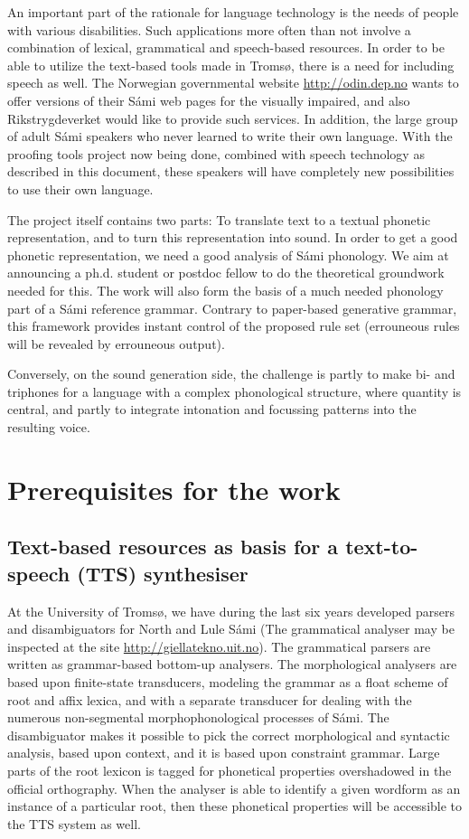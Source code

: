 \documentclass[a4paper,english]{article}
\begin{document}
An important part of the rationale for language technology is the needs of people with various disabilities. Such applications more often than not involve a combination of lexical, grammatical and speech-based resources. In order to be able to utilize the text-based tools made in Tromsø, there is a need for including speech as well. The Norwegian governmental website \url{http://odin.dep.no} wants to offer versions of their Sámi web pages for the visually impaired, and also Rikstrygdeverket would like to provide such services. In addition, the large group of adult Sámi speakers who never learned to write their own language. With the proofing tools project now being done, combined with speech technology as described in this document, these speakers will have completely new possibilities to use their own language.

The project itself contains two parts: To translate text to a textual phonetic representation, and to turn this representation into sound. In order to get a good phonetic representation, we need a good analysis of Sámi phonology. We aim at announcing a ph.d. student or postdoc fellow to do the theoretical groundwork needed for this. The work will also form the basis of a much needed phonology part of a Sámi reference grammar. Contrary to paper-based generative grammar, this framework provides instant control of the proposed rule set (errouneous rules will be revealed by errouneous output). 

Conversely, on the sound generation side, the challenge is partly to make bi- and triphones for a language with a complex phonological structure, where quantity is central, and partly to integrate intonation and focussing patterns into the resulting voice.



\section{Prerequisites for the work}

\subsection{Text-based resources as basis for a text-to-speech (TTS) synthesiser}

At the University of Tromsø, we have during the last six years developed parsers and disambiguators for North and Lule Sámi (The grammatical analyser may be inspected at the site \url{http://giellatekno.uit.no}). The grammatical parsers are written as grammar-based bottom-up analysers. The morphological analysers are based upon finite-state transducers, modeling the grammar as a float scheme of root and affix lexica, and with a separate transducer for dealing with the numerous non-segmental morphophonological processes of Sámi. The disambiguator makes it possible to pick the correct morphological and syntactic analysis, based upon context, and it is based upon constraint grammar. Large parts of the root lexicon is tagged for phonetical properties overshadowed in the official orthography. When the analyser is able to identify a given wordform as an instance of a particular root, then these phonetical properties will be accessible to the TTS system as well.
\end{document}
